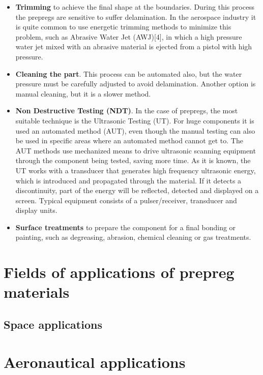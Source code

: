 \begin{itemize}
\item \textbf{Trimming} to achieve the final shape at the boundaries. During this process the prepregs are sensitive to suffer delamination. In the aerospace industry it is quite common to use energetic trimming methods to minimize this problem, such as Abrasive Water Jet (AWJ)[4], in which a high pressure water jet mixed with an abrasive material is ejected from a pistol with high pressure.
\item \textbf{Cleaning the part}. This process can be automated also, but the water pressure must be carefully adjusted to avoid delamination. Another option is manual cleaning, but it is a slower method.
\item \textbf{Non Destructive Testing (NDT)}. In the case of prepregs, the most suitable technique is the Ultrasonic Testing (UT). For huge components it is used an automated method (AUT), even though the manual testing can also be used in specific areas where an automated method cannot get to. The AUT methods use mechanized means to drive ultrasonic scanning equipment through the component being tested, saving more time. As it is known, the UT works with a transducer that generates high frequency ultrasonic energy, which is introduced and propagated through the material. If it detects a discontinuity, part of the energy will be reflected, detected and displayed on a screen. Typical equipment consists of a pulser/receiver, transducer and display units.
\item \textbf{Surface treatments} to prepare the component for a final bonding or painting, such as degreasing, abrasion, chemical cleaning or gas treatments.
\end{itemize}


\section{Fields of applications of prepreg materials}

\subsection{Space applications}

\section{Aeronautical applications}

